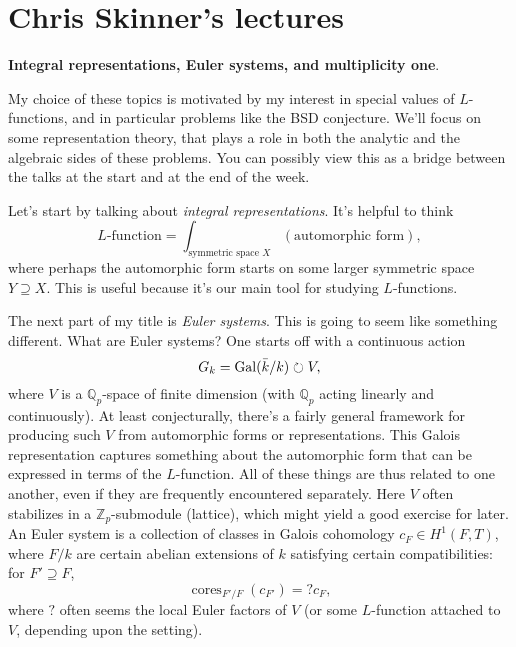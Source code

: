 \documentclass[reqno]{amsart} 
\begin{document}
\section{Chris Skinner's lectures}\label{sec:cq6tho1vem}
\textbf{Integral representations, Euler systems, and multiplicity one}.

My choice of these topics is motivated by my interest in special values of $L$-functions, and in particular problems like the BSD conjecture.  We'll focus on some representation theory, that plays a role in both the analytic and the algebraic sides of these problems.  You can possibly view this as a bridge between the talks at the start and at the end of the week.

Let's start by talking about \emph{integral representations}.  It's helpful to think
\begin{equation*}
  \text{$L$-function} =
  \int_{\text{symmetric space } X}
  (\text{automorphic form}),
\end{equation*}
where perhaps the automorphic form starts on some larger symmetric space $Y \supseteq X$.  This is useful because it's our main tool for studying $L$-functions.

The next part of my title is \emph{Euler systems}.  This is going to seem like something different.  What are Euler systems?  One starts off with a continuous action
\begin{equation*}
  G_k = \operatorname{Gal}(\bar{k} / k) \circlearrowright V,
\end{equation*}
where $V$ is a $\mathbb{Q}_p$-space of finite dimension (with $\mathbb{Q}_p$ acting linearly and continuously).  At least conjecturally, there's a fairly general framework for producing such $V$ from automorphic forms or representations.  This Galois representation captures something about the automorphic form that can be expressed in terms of the $L$-function.  All of these things are thus related to one another, even if they are frequently encountered separately.  Here $V$ often stabilizes in a $\mathbb{Z}_p$-submodule (lattice), which might yield a good exercise for later.  An Euler system is a collection of classes in Galois cohomology $c_F \in H^1(F, T)$, where $F / k$ are certain abelian extensions of $k$ satisfying certain compatibilities: for $F' \supseteq F$,
\begin{equation*}
  \operatorname{cores}_{F' / F}(c_{F '}) = ? c_F,
\end{equation*}
where $?$ often seems the local Euler factors of $V$ (or some $L$-function attached to $V$, depending upon the setting).
\end{document}
